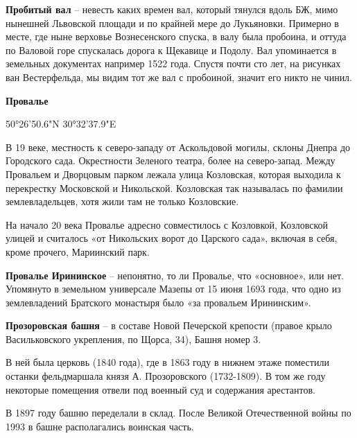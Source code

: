 \medskip

\textbf{Пробитый вал} – невесть каких времен вал, который тянулся вдоль БЖ, мимо нынешней Львовской площади и по крайней мере до Лукьяновки. Примерно в месте, где ныне верховье Вознесенского спуска, в валу была пробоина, и оттуда по Валовой горе спускалась дорога к Щекавице и Подолу. Вал упоминается в земельных документах например 1522 года. Спустя почти сто лет, на рисунках ван Вестерфельда, мы видим тот же вал с пробоиной, значит его никто не чинил.\\ 

\medskip

\textbf{Провалье} 

50°26'50.6"N 30°32'37.9"E

В 19 веке, местность к северо-зап\-аду от Аскольдовой могилы, склоны Днепра до Городского сада. Окрестности Зеленого театра, более на северо-запад. Между Провальем и Дворцовым парком лежала улица Козловская, которая выходила к перекрестку Московской и Никольской. Козловская так называлась по фамилии землевладельцев, хотя жили там не только Козловские.

На начало 20 века Провалье адресно совместилось с Козловкой, Козловской улицей и считалось «от Никольских ворот до Царского сада», включая в себя, кроме прочего, Мариинский парк.\\

\medskip

\textbf{Провалье Ирининское} – непонятно, то ли Провалье, что «основное», или нет. Упомянуто в земельном универсале Мазепы от 15 июня 1693 года, что одно из землевладений Братского монастыря было «за провальем Ирининским».\\

\medskip

\textbf{Прозоровская башня} – в составе Новой Печерской крепости (правое крыло Васильковского укрепления, по Щорса, 34), Башня номер 3.

В ней была церковь (1840 года), где в 1863 году в нижнем этаже поместили останки фельдмаршала князя А. Прозоровского (1732-1809). В том же году некоторые помещения отвели под военный суд и содержания арестантов.

В 1897 году башню переделали в склад. После Великой Отечественной войны по 1993 в башне располагались воинская часть.\\


